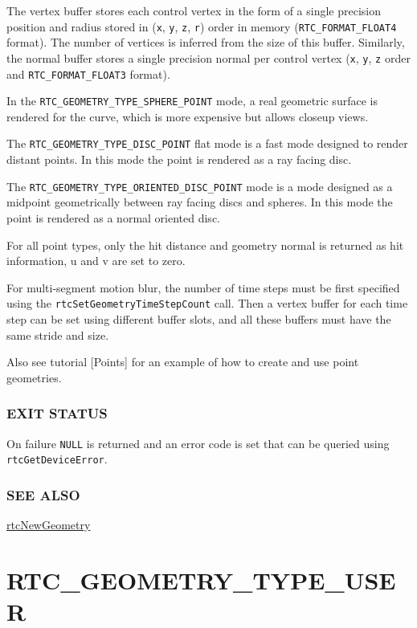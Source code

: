 The vertex buffer stores each control vertex in the form of a single
precision position and radius stored in (\texttt{x}, \texttt{y},
\texttt{z}, \texttt{r}) order in memory (\texttt{RTC\_FORMAT\_FLOAT4}
format). The number of vertices is inferred from the size of this
buffer. Similarly, the normal buffer stores a single precision normal
per control vertex (\texttt{x}, \texttt{y}, \texttt{z} order and
\texttt{RTC\_FORMAT\_FLOAT3} format).

In the \texttt{RTC\_GEOMETRY\_TYPE\_SPHERE\_POINT} mode, a real
geometric surface is rendered for the curve, which is more expensive but
allows closeup views.

The \texttt{RTC\_GEOMETRY\_TYPE\_DISC\_POINT} flat mode is a fast mode
designed to render distant points. In this mode the point is rendered as
a ray facing disc.

The \texttt{RTC\_GEOMETRY\_TYPE\_ORIENTED\_DISC\_POINT} mode is a mode
designed as a midpoint geometrically between ray facing discs and
spheres. In this mode the point is rendered as a normal oriented disc.

For all point types, only the hit distance and geometry normal is
returned as hit information, u and v are set to zero.

For multi-segment motion blur, the number of time steps must be first
specified using the \texttt{rtcSetGeometryTimeStepCount} call. Then a
vertex buffer for each time step can be set using different buffer
slots, and all these buffers must have the same stride and size.

Also see tutorial {[}Points{]} for an example of how to create and use
point geometries.

\subsubsection{EXIT STATUS}\label{exit-status}

On failure \texttt{NULL} is returned and an error code is set that can
be queried using \texttt{rtcGetDeviceError}.

\subsubsection{SEE ALSO}\label{see-also}

\hyperref[rtcnewgeometry]{rtcNewGeometry}

\pagebreak

\section{RTC\_GEOMETRY\_TYPE\_USER}\label{rtc_geometry_type_user}

